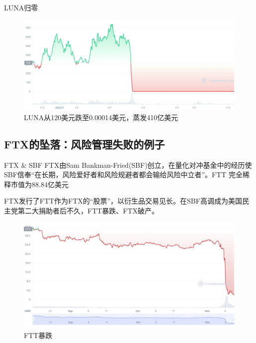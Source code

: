 \begin{frame}{LUNA归零}
    \begin{figure}[H]
        \includegraphics[width=0.6\linewidth]{img/luna.png}
        \caption{LUNA从120美元跌至0.00014美元，蒸发410亿美元}
    \end{figure}
\end{frame}

\subsection{FTX的坠落：风险管理失败的例子}

\begin{frame}{FTX \& SBF}
    FTX由Sam Bankman-Fried(SBF)创立，在量化对冲基金中的经历使SBF信奉“在长期，风险爱好者和风险规避者都会输给风险中立者”。FTT 完全稀释市值为88.84亿美元
    
    FTX发行了FTT作为FTX的“股票”，以衍生品交易见长。在SBF高调成为美国民主党第二大捐助者后不久，FTT暴跌、FTX破产。
\begin{figure}[H]
    \includegraphics[width=0.7\linewidth]{img/ftt.png}
    \caption{FTT暴跌}
\end{figure}
\end{frame}

